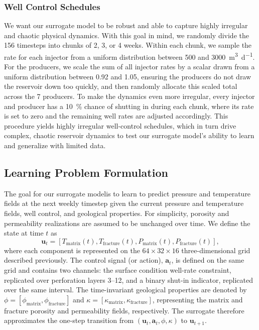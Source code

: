 \documentclass[pdflatex,sn-mathphys-ay]{sn-jnl}
\newcommand{\svec}{\mathbf{u}}            %
\newcommand{\action}{\mathbf{a}}           %
\begin{document}
\subsubsection{Well Control Schedules}
\label{sec:schedules}

We want our surrogate model to be robust and able to capture highly irregular and
chaotic physical dynamics. With this goal in mind, we randomly divide the 156
timesteps into chunks of 2, 3, or 4 weeks. Within each chunk, we sample the rate
for each injector from a uniform distribution between \SI{500}{} and
\SI{3000}{\cubic\meter\per\day}. For the producers, we scale the sum of all
injector rates by a scalar drawn from a uniform distribution between 0.92 and
1.05, ensuring the producers do not draw the reservoir down too quickly, and then
randomly allocate this scaled total across the 7 producers. To make the dynamics
even more irregular, every injector and producer has a \SI{10}{\percent} chance of
shutting in during each chunk, where its rate is set to zero and the remaining
well rates are adjusted accordingly. This procedure yields highly irregular
well-control schedules, which in turn drive complex, chaotic reservoir dynamics to
test our surrogate model's ability to learn and generalize with limited data.


\subsection{Learning Problem Formulation}
The goal for our surrogate modelis to learn to predict pressure and temperature fields at the next weekly timestep given the current pressure and temperature fields, well control, and geological properties. 
For simplicity, porosity and permeability realizations are assumed to be unchanged over time. We
define the state at time \(t\) as
\[
  \svec_t =
  [T_{\text{matrix}}(t), T_{\text{fracture}}(t),
   P_{\text{matrix}}(t), P_{\text{fracture}}(t)],
\]
where each component is represented on the \(64 \times 32 \times 16\)
three-dimensional grid described previously. The control signal (or action), \(\action_t\), is
defined on the same grid and contains two channels: the surface condition well-rate
constraint, replicated over perforation layers 3--12, and a binary shut-in
indicator, replicated over the same interval. The time-invariant geological
properties are denoted by
\(\phi=[\phi_{\text{matrix}},\phi_{\text{fracture}}]\) and
\(\kappa=[\kappa_{\text{matrix}},\kappa_{\text{fracture}}]\), representing the
matrix and fracture porosity and permeability fields, respectively. The
surrogate therefore approximates the one-step transition from
\((\svec_t,\action_t,\phi,\kappa)\) to \(\svec_{t+1}\).
\end{document}
